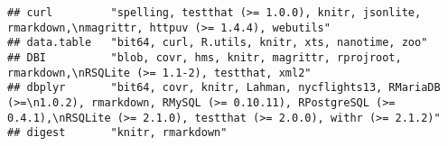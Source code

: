 \documentclass[]{article}
\begin{document}
\begin{verbatim}
## curl         "spelling, testthat (>= 1.0.0), knitr, jsonlite, rmarkdown,\nmagrittr, httpuv (>= 1.4.4), webutils"                                                                                                                                                                                                                                                                                                                                                                                                                                                                                       
## data.table   "bit64, curl, R.utils, knitr, xts, nanotime, zoo"                                                                                                                                                                                                                                                                                                                                                                                                                                                                                                                                         
## DBI          "blob, covr, hms, knitr, magrittr, rprojroot, rmarkdown,\nRSQLite (>= 1.1-2), testthat, xml2"                                                                                                                                                                                                                                                                                                                                                                                                                                                                                             
## dbplyr       "bit64, covr, knitr, Lahman, nycflights13, RMariaDB (>=\n1.0.2), rmarkdown, RMySQL (>= 0.10.11), RPostgreSQL (>= 0.4.1),\nRSQLite (>= 2.1.0), testthat (>= 2.0.0), withr (>= 2.1.2)"                                                                                                                                                                                                                                                                                                                                                                                                      
## digest       "knitr, rmarkdown"                                                                                                                                                                                                                                                                                                                                                                                                                                                                                                                                                                        

\end{verbatim}
\end{document}
